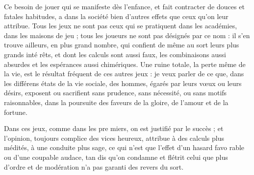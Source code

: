 Ce besoin de jouer qui se manifeste
dès l'enfance, et fait contracter de
douces et fatales habitudes, a dans
la société bien d'autres effets que ceux
qu'on leur attribue. Tous les jeux ne
sont pas ceux qui se pratiquent dans
les académies, dans les maisons de jeu ;
tous les joueurs ne sont pas désignés
par ce nom : il s'en trouve ailleurs, en
plus grand nombre, qui confient de
même au sort leurs plus grands inté%
rêts, et dont les calculs sont aussi faux,
les combinaisons aussi absurdes et les
espérances aussi chimériques. Une
ruine totale, la perte même de la vie,
est le résultat fréquent de ces autres
jeux : je veux parler de ce que, dans
les différens états de la vie sociale,
des hommes, égarés par leurs vœux
ou leurs désirs, exposent ou sacrifient
sans prudence, sans nécessité, ou sans
motifs raisonnables, dans la poursuite
des faveurs de la gloire, de l'amour et
de la fortune.

Dans ces jeux, comme dans les pre%
miers, on est justifié par le succès ; et
l'opinion, toujours complice des vices
heureux, attribue à des calculs plus
médités, à une conduite plus sage, ce
qui n'est que l'effet d'un hasard favo%
rable ou d'une coupable audace, tan%
dis qu'on condamne et flétrit celui que
plus d'ordre et de modération n'a pas
garanti des revers du sort.


